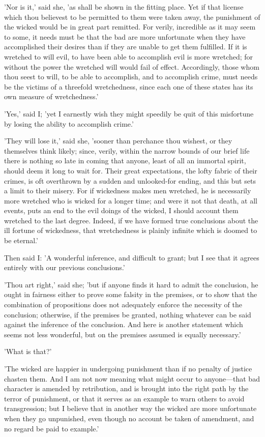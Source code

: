 'Nor is it,' said she, 'as shall be shown in the fitting place. Yet if
that license which thou believest to be permitted to them were taken
away, the punishment of the wicked would be in great part remitted. For
verily, incredible as it may seem to some, it needs must be that the bad
are more unfortunate when they have accomplished their desires than if
they are unable to get them fulfilled. If it is wretched to will evil,
to have been able to accomplish evil is more wretched; for without the
power the wretched will would fail of effect. Accordingly, those whom
thou seest to will, to be able to accomplish, and to accomplish crime,
must needs be the victims of a threefold wretchedness, since each one of
these states has its own measure of wretchedness.'

'Yes,' said I; 'yet I earnestly wish they might speedily be quit of this
misfortune by losing the ability to accomplish crime.'

'They will lose it,' said she, 'sooner than perchance thou wishest, or
they themselves think likely; since, verily, within the narrow bounds of
our brief life there is nothing so late in coming that anyone, least of
all an immortal spirit, should deem it long to wait for. Their great
expectations, the lofty fabric of their crimes, is oft overthrown by a
sudden and unlooked-for ending, and this but sets a limit to their
misery. For if wickedness makes men wretched, he is necessarily more
wretched who is wicked for a longer time; and were it not that death, at
all events, puts an end to the evil doings of the wicked, I should
account them wretched to the last degree. Indeed, if we have formed true
conclusions about the ill fortune of wickedness, that wretchedness is
plainly infinite which is doomed to be eternal.'

Then said I: 'A wonderful inference, and difficult to grant; but I see
that it agrees entirely with our previous conclusions.'

'Thou art right,' said she; 'but if anyone finds it hard to admit the
conclusion, he ought in fairness either to prove some falsity in the
premises, or to show that the combination of propositions does not
adequately enforce the necessity of the conclusion; otherwise, if the
premises be granted, nothing whatever can be said against the inference
of the conclusion. And here is another statement which seems not less
wonderful, but on the premises assumed is equally necessary.'

'What is that?'

'The wicked are happier in undergoing punishment than if no penalty of
justice chasten them. And I am not now meaning what might occur to
anyone—that bad character is amended by retribution, and is brought
into the right path by the terror of punishment, or that it serves as an
example to warn others to avoid transgression; but I believe that in
another way the wicked are more unfortunate when they go unpunished,
even though no account be taken of amendment, and no regard be paid to
example.'

